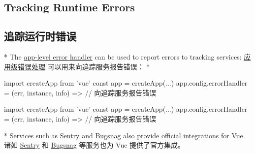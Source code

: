 \begin{paracol}{2}
\subsection{Tracking Runtime Errors}
\switchcolumn
\subsection{追踪运行时错误}
\switchcolumn[0]*%
The
\href{https://vuejs.org/api/application.html\#app-config-errorhandler}{app-level
error handler} can be used to report errors to tracking services:
\switchcolumn
\href{https://cn.vuejs.org/api/application.html\#app-config-errorhandler}{应用级错误处理}
可以用来向追踪服务报告错误：
\switchcolumn[0]*%
\begin{codeJs}
import { createApp } from 'vue'
const app = createApp(...)
app.config.errorHandler = (err, instance, info) => {
  // 向追踪服务报告错误
}
\end{codeJs}
\switchcolumn
\begin{codeJs}
import { createApp } from 'vue'
const app = createApp(...)
app.config.errorHandler = (err, instance, info) => {
  // 向追踪服务报告错误
}
\end{codeJs}
\switchcolumn[0]*%
Services such as
\href{https://docs.sentry.io/platforms/javascript/guides/vue/}{Sentry}
and \href{https://docs.bugsnag.com/platforms/javascript/vue/}{Bugsnag}
also provide official integrations for Vue.
\switchcolumn
诸如
\href{https://docs.sentry.io/platforms/javascript/guides/vue/}{Sentry}
和 \href{https://docs.bugsnag.com/platforms/javascript/vue/}{Bugsnag}
等服务也为 Vue 提供了官方集成。
\end{paracol}

 